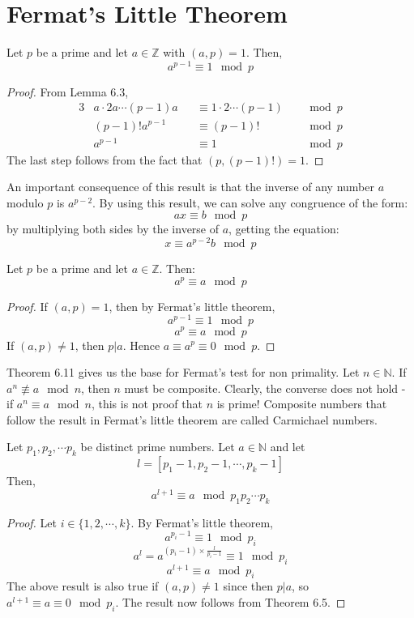 \documentclass[12pt,letterpaper]{amsbook}
\theoremstyle{definition}
\newcommand{\N}{\mathbb{N}}
\newcommand{\Z}{\mathbb{Z}}
\begin{document}
\section{Fermat's Little Theorem}

\phantom{}

\begin{theorem}
  Let $p$ be a prime and let $a \in \Z$ with $(a,p) = 1$. Then,
  \[a^{p-1} \equiv 1 \mod p\]
\end{theorem}
\begin{proof}
  From Lemma 6.3, 
\begin{alignat*}{3}
  & a \cdot 2a \cdots (p-1)a && \equiv 1 \cdot 2 \cdots (p-1) && \mod p \\
  &(p-1)! a^{p-1} && \equiv (p-1)! &&\mod p \\
  & a^{p-1} && \equiv 1 &&\mod p
\end{alignat*}
The last step follows from the fact that $(p,(p-1)!) = 1$.
\end{proof}

An important consequence of this result is that the inverse of any number $a$ modulo $p$ is $a^{p-2}$. By using this result, we can solve any congruence of the form:
\[ax \equiv b \mod p\]
by multiplying both sides by the inverse of $a$, getting the equation:
\[x \equiv a^{p-2} b \mod p\]

\begin{theorem}
  Let $p$ be a prime and let $a \in \Z$. Then:
  \[a^p \equiv a \mod p\]
\end{theorem}
\begin{proof}
  If $(a,p) = 1$, then by Fermat's little theorem,
  \[a^{p-1} \equiv 1 \mod p\]
  \[a^p \equiv a \mod p\]
  If $(a,p) \neq 1$, then $p|a$. Hence $a \equiv a^p \equiv 0 \mod p$.
\end{proof}

Theorem 6.11 gives us the base for Fermat's test for non primality. Let $n \in \N$. If $a^n \not \equiv a \mod n$, then $n$ must be composite. Clearly, the converse does not hold - if $a^n \equiv a \mod n$, this is not proof that $n$ is prime! Composite numbers that follow the result in Fermat's little theorem are called Carmichael numbers.

\begin{theorem}
  Let $p_1, p_2, \cdots p_k$ be distinct prime numbers. Let $a \in \N$ and let
  \[l = [p_1-1,p_2-1, \cdots, p_k-1]\]
  Then,
  \[a^{l+1} \equiv a \mod p_1p_2 \cdots p_k\]
\end{theorem}
\begin{proof}
  Let $i \in \{1,2,\cdots, k\}$. By Fermat's little theorem,
  \[a^{p_i-1} \equiv 1 \mod p_i\]
  \[a^l = a^{(p_i-1) \times \frac{l}{p_i-1}} \equiv 1 \mod p_i\]
  \[a^{l+1} \equiv a \mod p_i\]
  The above result is also true if $(a,p) \neq 1$ since then $p|a$, so $a^{l+1} \equiv a \equiv 0 \mod p_i$. The result now follows from Theorem 6.5.
\end{proof}
\end{document}
